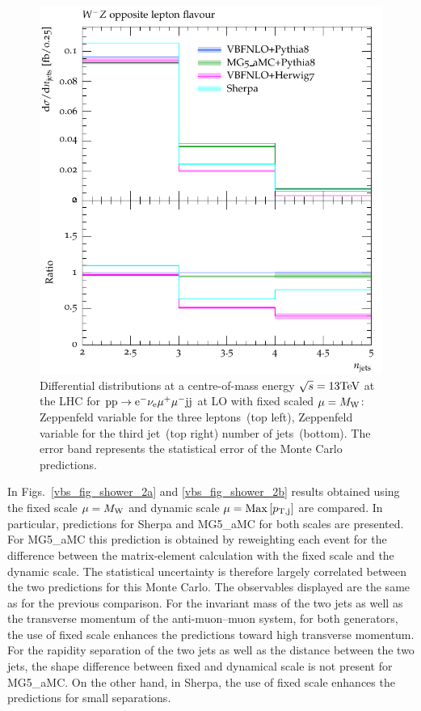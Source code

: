 \documentclass[11pt]{cernrep}
\begin{document}
\begin{figure}[htbp]
\begin{center}
   \includegraphics[scale=0.65]{figs/VBFNLO_WmZ_OF_nJets}
\caption{Differential distributions at a centre-of-mass energy $\sqrt{s}=13{\rm TeV}$ at the LHC for ${\rm p} {\rm p}
  \to {\rm e}^-  \nu_{\rm e}  \mu^+ \mu^- {\rm j} {\rm j}$ at LO with fixed scaled $\mu = M_{\rm W}$: 
                Zeppenfeld variable for the three leptons~(top left),
                Zeppenfeld variable for the third jet~(top right)
                number of jets~(bottom). The error band represents
                the statistical error of the Monte Carlo predictions. }
\label{vbs_fig_shower_1b}
\end{center}
\end{figure}

In Figs.~\ref{vbs_fig_shower_2a} and \ref{vbs_fig_shower_2b} results obtained using the fixed scale $\mu = M_{\rm W}$ and dynamic scale $\mu = {\rm Max}\left[p_{\rm T, j}\right]$ are compared.
In particular, predictions for {\sc Sherpa} and {\sc MG5\_aMC} for both scales are presented. For
{\sc MG5\_aMC} this prediction is obtained by reweighting each event for the difference between the matrix-element calculation
with the fixed scale and the dynamic scale. The statistical uncertainty is therefore largely
correlated between the two predictions for this Monte Carlo.  
The observables displayed are the same as for the previous comparison.
For the invariant mass of the two jets as well as the transverse momentum of the anti-muon--muon system, for both generators, the use of fixed scale enhances the predictions toward high transverse momentum.
For the rapidity separation of the two jets as well as the distance between the two jets, the shape difference between fixed and dynamical scale is not present for {\sc MG5\_aMC}.
On the other hand, in {\sc Sherpa}, the use of fixed scale enhances the predictions for small separations.
\end{document}
